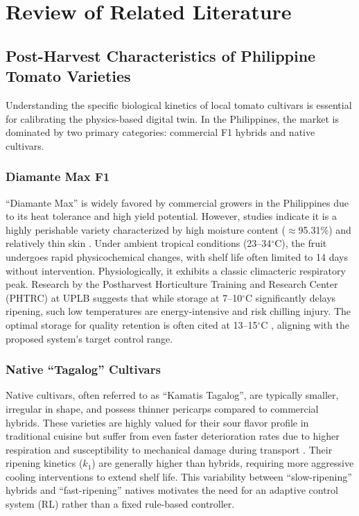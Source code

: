 \documentclass[conference]{IEEEtran}
\begin{document}
\FloatBarrier
\section{Review of Related Literature}
\label{sec:rrl}

\subsection{Post-Harvest Characteristics of Philippine Tomato Varieties}
Understanding the specific biological kinetics of local tomato cultivars is essential for calibrating the physics-based digital twin. In the Philippines, the market is dominated by two primary categories: commercial F1 hybrids and native cultivars.

\subsubsection{Diamante Max F1}
``Diamante Max'' is widely favored by commercial growers in the Philippines due to its heat tolerance and high yield potential. However, studies indicate it is a highly perishable variety characterized by high moisture content ($\approx$95.31\%) and relatively thin skin \cite{diamante_properties}. Under ambient tropical conditions (23--34$^\circ$C), the fruit undergoes rapid physicochemical changes, with shelf life often limited to 14 days without intervention.
Physiologically, it exhibits a classic climacteric respiratory peak. Research by the Postharvest Horticulture Training and Research Center (PHTRC) at UPLB suggests that while storage at 7--10$^\circ$C significantly delays ripening, such low temperatures are energy-intensive and risk chilling injury. The optimal storage for quality retention is often cited at 13--15$^\circ$C \cite{uplb_phtrc}, aligning with the proposed system's target control range.

\subsubsection{Native ``Tagalog'' Cultivars}
Native cultivars, often referred to as ``Kamatis Tagalog'', are typically smaller, irregular in shape, and possess thinner pericarps compared to commercial hybrids. These varieties are highly valued for their sour flavor profile in traditional cuisine but suffer from even faster deterioration rates due to higher respiration and susceptibility to mechanical damage during transport \cite{native_tomato}. Their ripening kinetics ($k_1$) are generally higher than hybrids, requiring more aggressive cooling interventions to extend shelf life. This variability between ``slow-ripening'' hybrids and ``fast-ripening'' natives motivates the need for an adaptive control system (RL) rather than a fixed rule-based controller.
\end{document}
